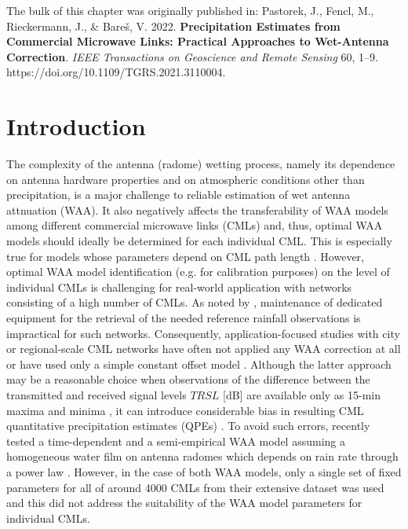 \documentclass{ctuthesis}\usepackage[]{graphicx}\usepackage[]{color}
\begin{document}
{\footnotesize The bulk of this chapter was originally published in: \newline
\-\hspace{0.5cm}
Pastorek, J., Fencl, M., Rieckermann, J., \& Bareš, V. 2022. \textbf{Precipitation Estimates from Commercial Microwave Links: Practical Approaches to Wet-Antenna Correction}. \emph{IEEE Transactions on Geoscience and Remote Sensing} 60, 1--9. \newline https://doi.org/10.1109/TGRS.2021.3110004.
}

\section{Introduction}

The complexity of the antenna (radome) wetting process, namely its dependence on antenna hardware properties \citep[e.g. coating;][]{lethMeasurementCampaignAssess2018} and on atmospheric conditions other than precipitation, is a major challenge to reliable estimation of wet antenna attnuation (WAA). It also negatively affects the transferability of WAA models among different commercial microwave links (CMLs) and, thus, optimal WAA models should ideally be determined for each individual CML. This is especially true for models whose parameters depend on CML path length \citep[e.g.][]{kharadlyEffectWetAntenna2001}. However, optimal WAA model identification (e.g. for calibration purposes) on the level of individual CMLs is challenging for real-world application with networks consisting of a high number of CMLs. As noted by \cite{ostrometzkyWetAntennaEffectFactor2018}, maintenance of dedicated equipment for the retrieval of the needed reference rainfall observations is impractical for such networks. Consequently, application-focused studies with city or regional-scale CML networks have often not applied any WAA correction at all \citep{chwalaPrecipitationObservationUsing2012, smiatekPotentialCommercialMicrowave2017} or have used only a simple constant offset model \citep{pastorekCommercialMicrowaveLinks2019, overeemMeasuringUrbanRainfall2011, roversiCommercialMicrowaveLinks2020, fenclAtmosphericObservationsEband2020}. Although the latter approach may be a reasonable choice when observations of the difference between the transmitted and received signal levels $T\!R\!S\!L$ [dB] are available only as 15-min maxima and minima  \citep{chwalaCommercialMicrowaveLink2019}, it can introduce considerable bias in resulting CML quantitative precipitation estimates (QPEs) \citep{pastorekCommercialMicrowaveLinks2019, fenclQuantifyingWetAntenna2019}. To avoid such errors, \cite{grafRainfallEstimationGermanwide2020} recently tested a time-dependent \citep{schleissQuantificationModelingWetAntenna2013} and a semi-empirical WAA model assuming a homogeneous water film on antenna radomes which depends on rain rate through a power law \citep{leijnseMicrowaveLinkRainfall2008}. However, in the case of both WAA models, only a single set of fixed parameters for all of around 4000 CMLs from their extensive dataset was used and this did not address the suitability of the WAA model parameters for individual CMLs.
\end{document}
